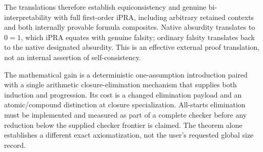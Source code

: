 The translations therefore establish equiconsistency and genuine
bi-interpretability with full first-order iPRA, including arbitrary
retained contexts and both internally provable formula composites.
Native absurdity translates to $0=1$, which iPRA equates with genuine
falsity; ordinary falsity translates back to the native designated
absurdity. This is an effective external proof translation, not an
internal assertion of self-consistency.

The mathematical gain is a deterministic one-assumption introduction
paired with a single arithmetic closure-elimination mechanism that
supplies both induction and progression. Its cost is a changed
elimination payload and an atomic/compound distinction at closure
specialization. All-starts elimination must be implemented and measured
as part of a complete checker before any reduction below the supplied
checker frontier is claimed. The theorem alone establishes a different
exact axiomatization, not the user's requested global size record.
